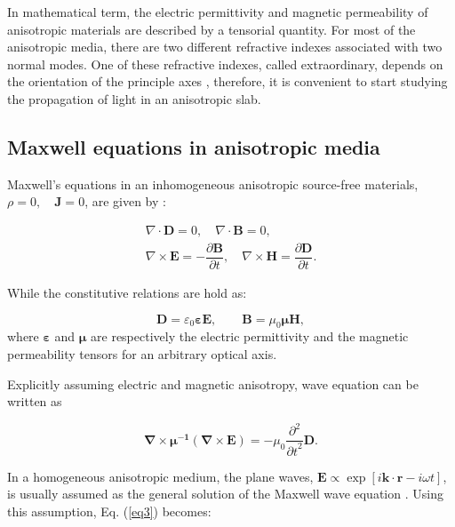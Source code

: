 \documentclass[9pt,twocolumn,twoside]{osajnl}
\begin{document}
In mathematical term, the electric permittivity and magnetic permeability of anisotropic materials are described by a tensorial quantity. For most of the anisotropic media, there are two different refractive indexes associated with two normal modes. One of these refractive indexes, called extraordinary, depends on the orientation of the principle axes \cite{saleh1991fundamentals, born1999principles, yariv1984optical}, therefore, it is convenient to start studying the propagation of light in an anisotropic slab.

\subsection{Maxwell equations in  anisotropic media}\label{Maxwell's equations in the homogeneous anisotropic media}

 Maxwell's equations in an inhomogeneous anisotropic source-free materials, $\rho=0, \quad \mathbf{J}=0 $,  are given by \cite{jackson1962classical}:

\begin{gather}
\nabla\cdot \mathbf{D} =0,\quad \nabla\cdot \mathbf{B} =0, \nonumber \\
\nabla\times\mathbf{E}=-\dfrac{\partial\mathbf{B}}{\partial t}, \quad \nabla\times\mathbf{H} =\dfrac{\partial\mathbf{D}}{\partial t}.\label{m.h}
\end{gather}

While the constitutive relations are hold as:

 \begin{equation} 
 \mathbf {D}=\varepsilon_0 \boldsymbol \varepsilon \mathbf{E},  \qquad
  \mathbf{B}=\mu_0 \boldsymbol\mu \mathbf{H},
  \end{equation}
where $\boldsymbol{\varepsilon}$ and $\boldsymbol{\mu}$  are respectively the electric permittivity and  the magnetic permeability tensors for an arbitrary optical axis. 

 Explicitly assuming electric and magnetic anisotropy, wave equation can be written as
 
\begin{equation}
\mathbf{\nabla}\times{\boldsymbol{\mu^{-1}}(\mathbf{\nabla}\times\mathbf{E})}=-\mu_{0}\dfrac{\partial^{2}}{{\partial{t}}^{2}}\mathbf{D}.
\label{eq3}
\end{equation}

In a homogeneous anisotropic medium, the plane waves, $ \mathbf{E}\propto \exp\left[i\mathbf{k} \cdot  \mathbf{r}- i\omega t \right]$, is usually assumed as the general solution of the Maxwell wave equation \cite{hao2008electromagnetic}. Using this assumption, Eq. (\ref{eq3}) becomes:
   
\end{document}
